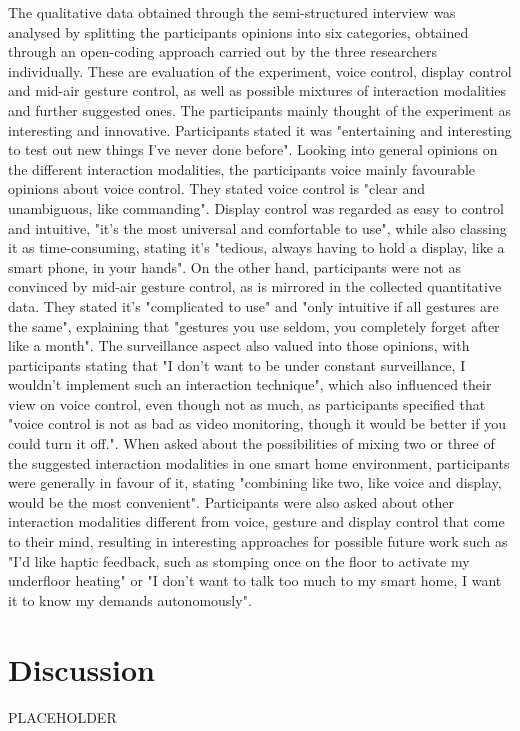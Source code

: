 \documentclass[sigchi]{acmart}
\begin{document}
	The qualitative data obtained through the semi-structured interview was analysed by splitting the participants opinions into six categories, obtained through an open-coding approach carried out by the three researchers individually. These are evaluation of the experiment, voice control, display control and mid-air gesture control, as well as possible mixtures of interaction modalities and further suggested ones. The participants mainly thought of the experiment as interesting and innovative. Participants stated it was "entertaining and interesting to test out new things I've never done before". Looking into general opinions on the different interaction modalities, the participants voice mainly favourable opinions about voice control. They stated voice control is "clear and unambiguous, like commanding". Display control was regarded as easy to control and intuitive, "it's the most universal and comfortable to use", while also classing it as time-consuming, stating it's "tedious, always having to hold a display, like a smart phone, in your hands". On the other hand, participants were not as convinced by mid-air gesture control, as is mirrored in the collected quantitative data. They stated it's "complicated to use" and "only intuitive if all gestures are the same", explaining that "gestures you use seldom, you completely forget after like a month". The surveillance aspect also valued into those opinions, with participants stating that "I don't want to be under constant surveillance, I wouldn't implement such an interaction technique", which also influenced their view on voice control, even though not as much, as participants specified that "voice control is not as bad as video monitoring, though it would be better if you could turn it off.". When asked about the possibilities of mixing two or three of the suggested interaction modalities in one smart home environment, participants were generally in favour of it, stating "combining like two, like voice and display, would be the most convenient". Participants were also asked about other interaction modalities different from voice, gesture and display control that come to their mind, resulting in interesting approaches for possible future work such as "I'd like haptic feedback, such as stomping once on the floor to activate my underfloor heating" or "I don't want to talk too much to my smart home, I want it to know my demands autonomously". 
	
	\section{Discussion}
	PLACEHOLDER
	
\end{document}
